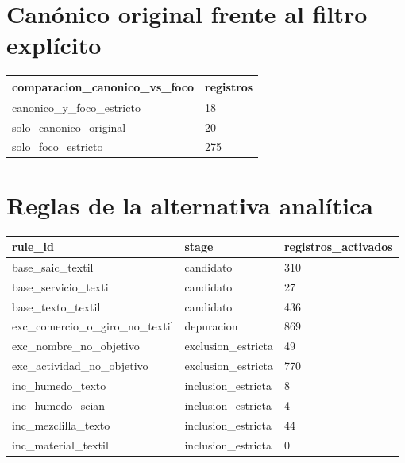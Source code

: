 \documentclass[11pt]{article}
\begin{document}
\section{Canónico original frente al filtro explícito}

\begin{tabular}{ll}
\toprule
comparacion\_canonico\_vs\_foco & registros \\
\midrule
canonico\_y\_foco\_estricto & 18 \\
solo\_canonico\_original & 20 \\
solo\_foco\_estricto & 275 \\
\bottomrule
\end{tabular}

\section{Reglas de la alternativa analítica}

\begin{tabular}{lll}
\toprule
rule\_id & stage & registros\_activados \\
\midrule
base\_saic\_textil & candidato & 310 \\
base\_servicio\_textil & candidato & 27 \\
base\_texto\_textil & candidato & 436 \\
exc\_comercio\_o\_giro\_no\_textil & depuracion & 869 \\
exc\_nombre\_no\_objetivo & exclusion\_estricta & 49 \\
exc\_actividad\_no\_objetivo & exclusion\_estricta & 770 \\
inc\_humedo\_texto & inclusion\_estricta & 8 \\
inc\_humedo\_scian & inclusion\_estricta & 4 \\
inc\_mezclilla\_texto & inclusion\_estricta & 44 \\
inc\_material\_textil & inclusion\_estricta & 0 \\
\bottomrule
\end{tabular}
\end{document}

